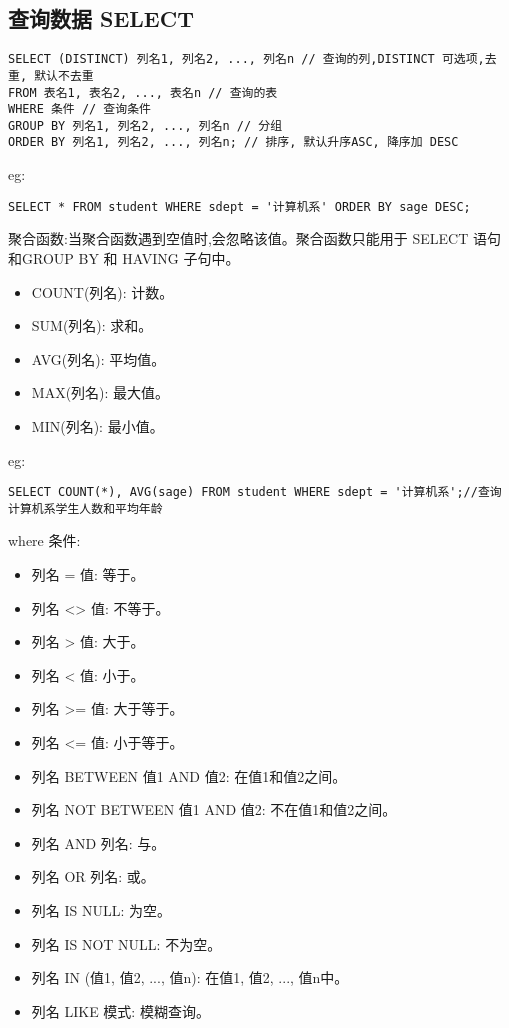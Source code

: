 \subsection{\color{red}查询数据 SELECT}
\begin{lstlisting}
SELECT (DISTINCT) 列名1, 列名2, ..., 列名n // 查询的列,DISTINCT 可选项,去重, 默认不去重
FROM 表名1, 表名2, ..., 表名n // 查询的表
WHERE 条件 // 查询条件
GROUP BY 列名1, 列名2, ..., 列名n // 分组
ORDER BY 列名1, 列名2, ..., 列名n; // 排序, 默认升序ASC, 降序加 DESC
\end{lstlisting}
eg:
\begin{lstlisting}
SELECT * FROM student WHERE sdept = '计算机系' ORDER BY sage DESC;
\end{lstlisting}
聚合函数:当聚合函数遇到空值时,会忽略该值。聚合函数只能用于 SELECT 语句和GROUP BY 和 HAVING 子句中。
\begin{itemize}
    \item COUNT(列名): 计数。
    \item SUM(列名): 求和。
    \item AVG(列名): 平均值。
    \item MAX(列名): 最大值。
    \item MIN(列名): 最小值。
\end{itemize}
eg:
\begin{lstlisting}
SELECT COUNT(*), AVG(sage) FROM student WHERE sdept = '计算机系';//查询计算机系学生人数和平均年龄
\end{lstlisting}
where 条件:
\begin{itemize}
    \item 列名 = 值: 等于。
    \item 列名 <> 值: 不等于。
    \item 列名 > 值: 大于。
    \item 列名 < 值: 小于。
    \item 列名 >= 值: 大于等于。
    \item 列名 <= 值: 小于等于。
    \item 列名 BETWEEN 值1 AND 值2: 在值1和值2之间。
    \item 列名 NOT BETWEEN 值1 AND 值2: 不在值1和值2之间。
    \item 列名 AND 列名: 与。
    \item 列名 OR 列名: 或。
    \item 列名 IS NULL: 为空。
    \item 列名 IS NOT NULL: 不为空。
    \item 列名 IN (值1, 值2, ..., 值n): 在值1, 值2, ..., 值n中。
    \item 列名 LIKE 模式: 模糊查询。
    
\end{itemize}
